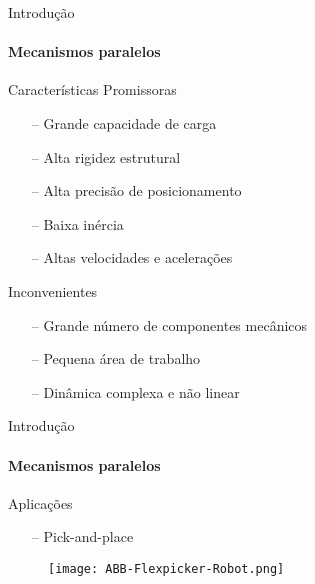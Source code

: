 \documentclass[25pt,landscape]{beamer}
\begin{document}
\begin{frame}
    \titlepage
\end{frame}

\begin{frame}{Introdução}
    \framesubtitle{Mecanismos paralelos}
    \pause
    \begin{block}{Caracter\'isticas Promissoras}
    	\pause
        \begin{itemize} 
            \item[--] Grande capacidade de carga \\[8pt]
            \item[--] Alta rigidez estrutural \\[8pt]
            \item[--] Alta precis\~ao de posicionamento \\[8pt]
            \item[--] Baixa in\'ercia \\[8pt]
            \item[--] Altas velocidades e acelera\c{c}\~oes \\[8pt]
        \end{itemize}
    \end{block}
    \pause
    \begin{block}{Inconvenientes}
    	\pause
        \begin{itemize}
        	\item[--] Grande n\'umero de componentes mec\^anicos \\[8pt]
            \item[--] Pequena \'area de trabalho \\[8pt]
            \item[--] Din\^amica complexa e n\~ao linear \\[8pt]
        \end{itemize}
    \end{block}
\end{frame}

\begin{frame}{Introdução}
    \framesubtitle{Mecanismos paralelos}
    \begin{block}{Aplica\c{c}\~oes}
        \begin{itemize}
            \item[--] Pick-and-place
        \end{itemize}
    \end{block}
    \begin{figure}[!h]
        \centering
        \texttt{[image: ABB-Flexpicker-Robot.png]}
    \end{figure}  
\end{frame}
\end{document}

